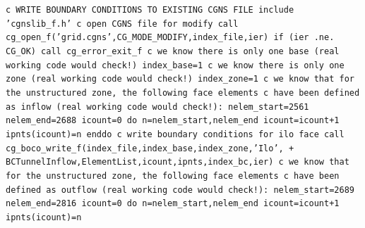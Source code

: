 \documentclass[12pt]{article}
\begin{document}
{\tt \noindent c  WRITE BOUNDARY CONDITIONS TO EXISTING CGNS FILE
\newline\indent      include 'cgnslib\_f.h'
\newline c  open CGNS file for modify
\newline\indent      call cg\_open\_f('grid.cgns',CG\_MODE\_MODIFY,index\_file,ier)
\newline\indent      if (ier .ne. CG\_OK) call cg\_error\_exit\_f
\newline c  we know there is only one base (real working code would check!)
\newline\indent      index\_base=1
\newline c  we know there is only one zone (real working code would check!)
\newline\indent      index\_zone=1
\newline c  we know that for the unstructured zone, the following face elements
\newline c  have been defined as inflow (real working code would check!):
\newline\indent      nelem\_start=2561
\newline\indent      nelem\_end=2688
\newline\indent      icount=0
\newline\indent      do n=nelem\_start,nelem\_end
\newline\indent\indent        icount=icount+1
\newline\indent\indent        ipnts(icount)=n
\newline\indent      enddo
\newline c  write boundary conditions for ilo face
\newline\indent      call cg\_boco\_write\_f(index\_file,index\_base,index\_zone,'Ilo',
\newline + \indent BCTunnelInflow,ElementList,icount,ipnts,index\_bc,ier)
\newline c  we know that for the unstructured zone, the following face elements
\newline c  have been defined as outflow (real working code would check!):
\newline\indent      nelem\_start=2689
\newline\indent      nelem\_end=2816
\newline\indent      icount=0
\newline\indent      do n=nelem\_start,nelem\_end
\newline\indent\indent        icount=icount+1
\newline\indent\indent        ipnts(icount)=n
}
\end{document}
